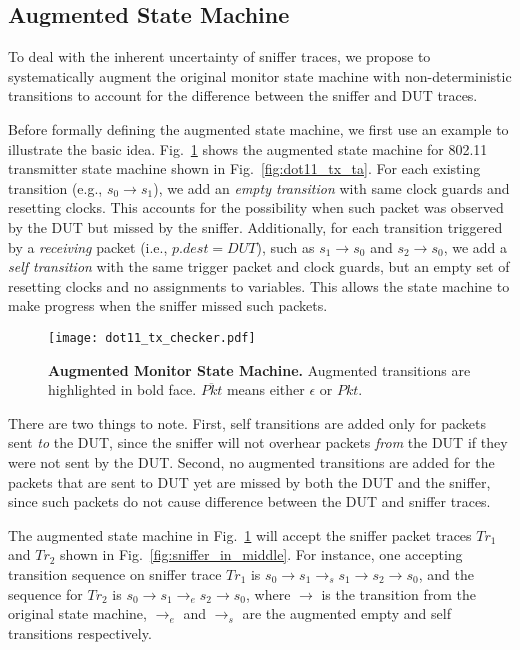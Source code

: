 \subsection{Augmented State Machine}
\label{subsec:augment}

To deal with the inherent uncertainty of sniffer traces, we propose to
systematically augment the original monitor state machine with non-deterministic
transitions to account for the difference between the sniffer and DUT traces.


Before formally defining the augmented state machine, we first use an example to
illustrate the basic idea. Fig.~\ref{fig:augment} shows the augmented state
machine for 802.11 transmitter state machine shown in
Fig.~\ref{fig:dot11_tx_ta}.  For each existing transition (e.g., $s_0\rightarrow
s_1$), we add an \textit{empty transition} with same clock guards and resetting
clocks.  This accounts for the possibility when such packet was observed by
the DUT but missed by the sniffer.  Additionally, for each transition triggered
by a \textit{receiving} packet (i.e., $p.dest = DUT$), such as $s_1\rightarrow
s_0$ and $s_2\rightarrow s_0$, we add a \textit{self transition} with the same
trigger packet and clock guards, but an empty set of resetting clocks and no
assignments to variables. This allows the state machine to make progress when
the sniffer missed such packets.

\begin{figure}[t!]
  \centering
  \texttt{[image: dot11\_tx\_checker.pdf]}
  \caption{\textbf{Augmented Monitor State Machine.} Augmented transitions are
  highlighted in bold face. $\overline{Pkt}$ means either $\epsilon$ or $Pkt$.}
  \label{fig:augment}
\end{figure}


There are two things to note. First, self transitions are added only for
packets sent \textit{to} the DUT, since the sniffer will not overhear packets
\textit{from} the DUT if they were not sent by the DUT. Second, no augmented
transitions are added for the packets that are sent to DUT yet are missed by both
the DUT and the sniffer, since such packets do not cause difference between the
DUT and sniffer traces.

The augmented state machine in Fig.~\ref{fig:augment} will accept the sniffer
packet traces $Tr_1$ and $Tr_2$ shown in Fig.~\ref{fig:sniffer_in_middle}.  For
instance, one accepting transition sequence on sniffer trace $Tr_1$ is
$s_0\rightarrow s_1 \rightarrow_s s_1\rightarrow s_2 \rightarrow s_0$, and the
sequence for $Tr_2$ is $s_0 \rightarrow s_1 \rightarrow_e s_2 \rightarrow s_0$,
where $\rightarrow$ is the transition from the original state machine,
$\rightarrow_e$ and $\rightarrow_s$ are the augmented empty and self transitions
respectively.

